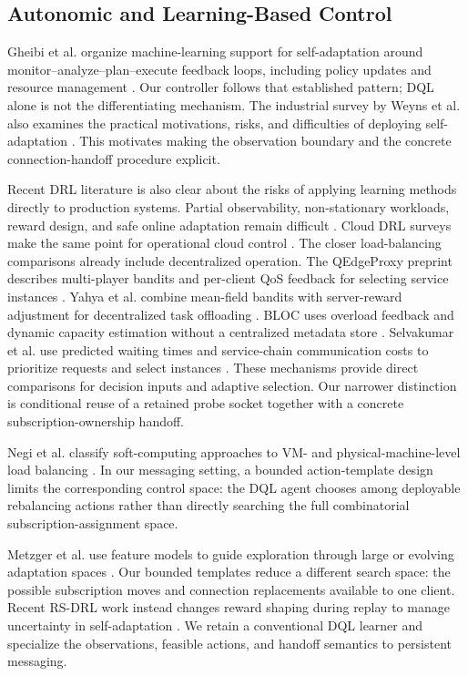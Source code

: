 \subsection{Autonomic and Learning-Based Control}

Gheibi et al. organize machine-learning support for self-adaptation around
monitor--analyze--plan--execute feedback loops, including policy updates and
resource management \cite{Gheibi2021MLSelfAdaptation}. Our controller follows
that established pattern; DQL alone is not the differentiating mechanism.
The industrial survey by Weyns et al. also examines the practical motivations,
risks, and difficulties of deploying self-adaptation
\cite{Weyns2023Industry}. This motivates making the observation boundary and
the concrete connection-handoff procedure explicit.

Recent DRL literature is also clear about the risks of applying learning
methods directly to production systems. Partial observability, non-stationary
workloads, reward design, and safe online adaptation remain difficult
\cite{DulacArnold2021}. Cloud DRL surveys make the same point for operational
cloud control \cite{Zhou2024DRLCloudReview}. The closer load-balancing
comparisons already include decentralized operation. The QEdgeProxy preprint
describes multi-player bandits and per-client QoS feedback for selecting
service instances \cite{Cilic2025}. Yahya et al. combine mean-field bandits
with server-reward adjustment for decentralized task offloading
\cite{Yahya2024}. BLOC uses overload feedback and dynamic capacity estimation
without a centralized metadata store \cite{Bhattacharya2024}. Selvakumar
et al. use predicted waiting times and service-chain communication costs to
prioritize requests and select instances \cite{Selvakumar2023}. These
mechanisms provide direct comparisons for decision inputs and adaptive
selection. Our narrower distinction is conditional reuse of a retained probe
socket together with a concrete subscription-ownership handoff.

Negi et al. classify soft-computing approaches to VM- and physical-machine-level
load balancing \cite{Singh2023SoftCloudLB}. In our messaging setting, a bounded
action-template design limits the corresponding control space: the DQL agent
chooses among deployable rebalancing actions rather than directly searching
the full combinatorial subscription-assignment space.

Metzger et al. use feature models to guide exploration through large or
evolving adaptation spaces \cite{Metzger2024GuidedExploration}. Our bounded
templates reduce a different search space: the possible subscription moves
and connection replacements available to one client. Recent RS-DRL work
instead changes reward shaping during replay to manage uncertainty in
self-adaptation \cite{Kavianifar2026RSDRL}. We retain a conventional DQL
learner and specialize the observations, feasible actions, and handoff
semantics to persistent messaging.

